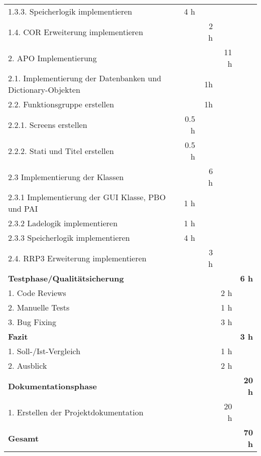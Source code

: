 \begin{tabu}{lrrrr}
1.3.3. Speicherlogik implementieren & 4 h & & & \\
1.4. COR Erweiterung implementieren & & 2 h & & \\
2. APO Implementierung & & & 11 h & \\
2.1. Implementierung der Datenbanken und Dictionary-Objekten & & 1h & & \\
2.2. Funktionsgruppe erstellen & & 1h & & \\
2.2.1. Screens erstellen & 0.5 h & & & \\
2.2.2. Stati und Titel erstellen & 0.5 h & & & \\
2.3 Implementierung der Klassen & & 6 h & & \\
2.3.1 Implementierung der GUI Klasse, PBO und PAI & 1 h & & & \\
2.3.2 Ladelogik implementieren & 1 h & & & \\
2.3.3 Speicherlogik implementieren & 4 h & & & \\
2.4. RRP3 Erweiterung implementieren & & 3 h & & \\
\rowfont{\color{headingfont}}\textbf{Testphase/Qualitätsicherung} & \textbf{} & \textbf{} & \textbf{} & \textbf{6 h} \\
1. Code Reviews & & & 2 h   &  \\
 2. Manuelle Tests & & & 1 h & \\
3. Bug Fixing & & & 3 h & \\
\rowfont{\color{headingfont}}\textbf{Fazit} & \textbf{} & \textbf{} & \textbf{} & \textbf{3 h} \\
1. Soll-/Ist-Vergleich & & & 1 h   &  \\
2. Ausblick & & & 2 h & \\
\rowfont{\color{headingfont}}\textbf{Dokumentationsphase} & \textbf{} & \textbf{} & \textbf{} & \textbf{20 h} \\1. Erstellen der Projektdokumentation & & & 20 h & \\
\hline
\hline
{}\textbf{Gesamt} & \textbf{} & \textbf{} & \textbf{} & \textbf{70 h} \\
\end{tabu}
